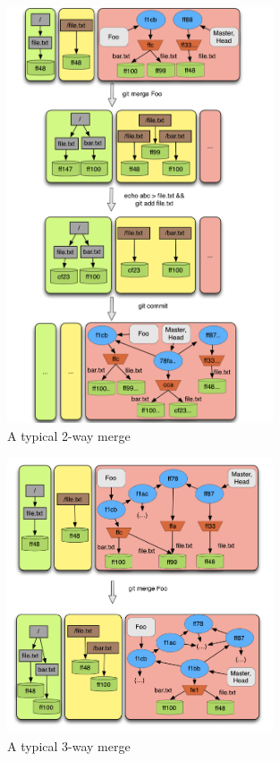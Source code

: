 \begin{figure}[!t]
   \centering
   \includegraphics[width=0.7\textwidth]{images/merge2way}
   \caption{A typical 2-way merge}\label{fig:merge2way}
\end{figure}
\begin{figure}[!t]
   \centering
   \includegraphics[width=0.7\textwidth]{images/merge3way}
   \caption{A typical 3-way merge}\label{fig:merge3way}
\end{figure}

